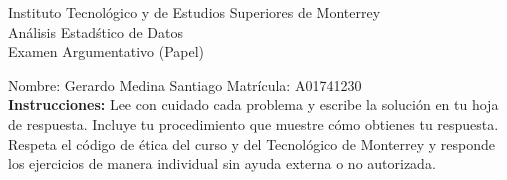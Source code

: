 \documentclass[10pt]{report}
\begin{document}
\newpage



\begin{center}
{\large Instituto Tecnol\'{o}gico y de Estudios Superiores de Monterrey \\
An\'alisis Estad\'stico de Datos } \\
Examen Argumentativo (Papel)
\end{center}

Nombre: \underline{\hspace*{.2in}}
Gerardo Medina Santiago
\underline{\hspace*{.2in}} \quad Matr\'icula:\underline{\hspace*{.2in}}
A01741230
\underline{\hspace*{.2in}} \\

{\bf Instrucciones:} Lee con cuidado cada problema y escribe la soluci\'on
en tu hoja de respuesta. Incluye tu procedimiento que muestre c\'omo obtienes tu respuesta.  Respeta el c\'odigo de \'etica del curso y del Tecnol\'ogico de Monterrey y responde los ejercicios de manera individual sin ayuda externa o no autorizada.
\end{document}
